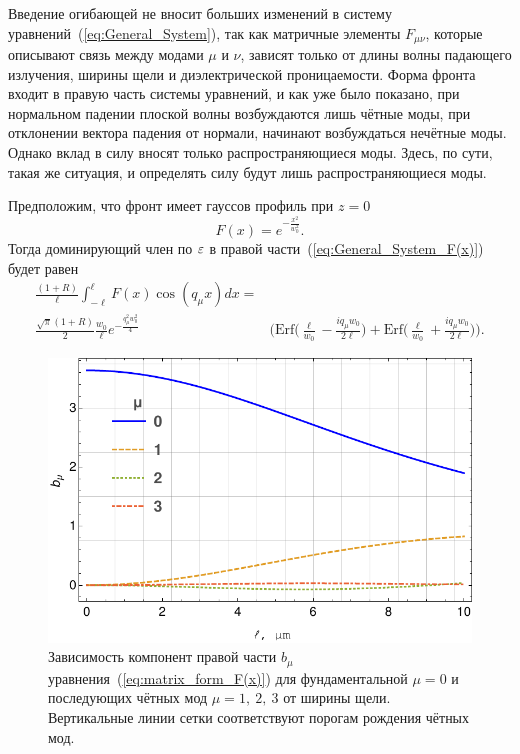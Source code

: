 Введение огибающей не вносит больших изменений в систему уравнений~(\ref{eq:General_System}), так как матричные элементы $F_{\mu \nu}$, которые описывают связь между модами $\mu$ и $\nu$, зависят только от длины волны падающего излучения, ширины щели и диэлектрической проницаемости. Форма фронта входит в правую часть системы уравнений, и как уже было показано, при нормальном падении плоской волны возбуждаются лишь чётные моды, при отклонении вектора падения от нормали, начинают возбуждаться нечётные моды. Однако вклад в силу вносят только распространяющиеся моды. Здесь, по сути, такая же ситуация, и определять силу будут лишь распространяющиеся моды. 

Предположим, что фронт имеет гауссов профиль при $z = 0$
\begin{equation}
    F(x) = e^{-\frac{x^2}{w_0^2}}.
\end{equation}
Тогда доминирующий член по $\varepsilon$ в правой части~(\ref{eq:General_System_F(x)}) будет равен
    \begin{align}
    \frac{(1+R)}{\ell}\int_{-\ell}^\ell F(x) \cos(q_\mu x) dx =& \nonumber \\ \frac{\sqrt{\pi}(1+R)}{2}\frac{w_0}{\ell}e^{-\frac{q_\mu^2 w_0^2}{4}} & \Bigg( \text{Erf}\Big(\frac{\ell}{w_0} - \frac{i q_\mu w_0}{2 \ell}\Big) + \text{Erf}\Big(\frac{\ell}{w_0} + \frac{i q_\mu w_0}{2 \ell}\Big) \Bigg).
\end{align}
\begin{figure}
    \centering
    \includegraphics[width = \textwidth]{figures/Bm.pdf}
    \caption{Зависимость компонент правой части $b_\mu$ уравнения~(\ref{eq:matrix_form_F(x)}) для фундаментальной $\mu = 0$ и последующих чётных мод $\mu = 1,\ 2,\ 3$ от ширины щели. Вертикальные линии сетки соответствуют порогам рождения чётных мод.}
    \label{fig:b_mu_F(x)}
\end{figure}
